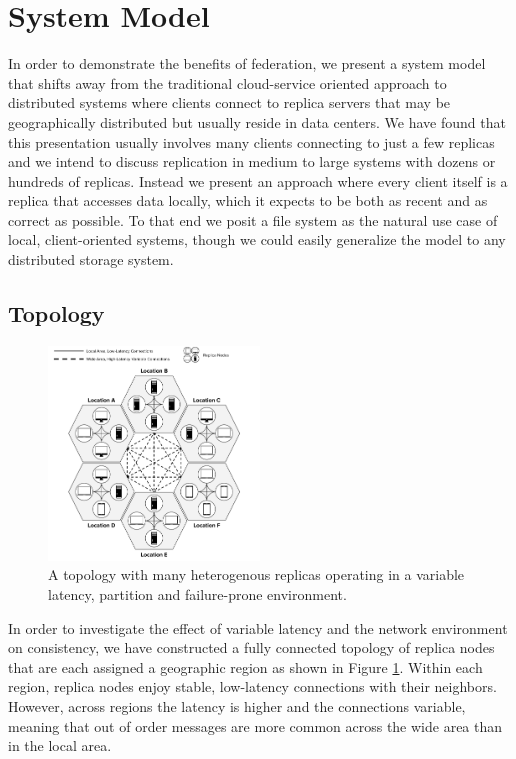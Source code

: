 \documentclass[10pt,conference,letterpaper]{IEEEtran}
\begin{document}
\section{System Model}

In order to demonstrate the benefits of federation, we present a system model that shifts away from the traditional cloud-service oriented approach to distributed systems where clients connect to replica servers that may be geographically distributed but usually reside in data centers. We have found that this presentation usually involves many clients connecting to just a few replicas and we intend to discuss replication in medium to large systems with dozens or hundreds of replicas. Instead we present an approach where every client itself is a replica that accesses data locally, which it expects to be both as recent and as correct as possible. To that end we posit a file system as the natural use case of local, client-oriented systems, though we could easily generalize the model to any distributed storage system.

\subsection{Topology}

\begin{figure}[h]
    \centering
    \includegraphics[width=0.5\textwidth]{figures/topology}
    \caption{A topology with many heterogenous replicas operating in a variable latency, partition and failure-prone environment.}
    \label{fig:topology}
\end{figure}

In order to investigate the effect of variable latency and the network environment on consistency, we have constructed a fully connected topology of replica nodes that are each assigned a geographic region as shown in Figure \ref{fig:topology}. Within each region, replica nodes enjoy stable, low-latency connections with their neighbors. However, across regions the latency is higher and the connections variable, meaning that out of order messages are more common across the wide area than in the local area.
\end{document}
